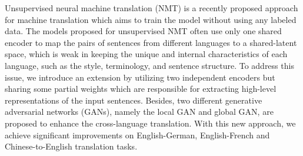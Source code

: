 Unsupervised neural machine translation (NMT) is a recently proposed approach for machine translation which aims to train the model without using any labeled data. The models proposed for unsupervised NMT often use only one shared encoder to map the pairs of sentences from different languages to a shared-latent space, which is weak in keeping the unique and internal characteristics of each language, such as the style, terminology, and sentence structure. To address this issue, we introduce an extension by utilizing two independent encoders but sharing some partial weights which are responsible for extracting high-level representations of the input sentences. Besides, two different generative adversarial networks (GANs), namely the local GAN and global GAN, are proposed to enhance the cross-language translation. With this new approach, we achieve significant improvements on English-German, English-French and Chinese-to-English translation tasks.
